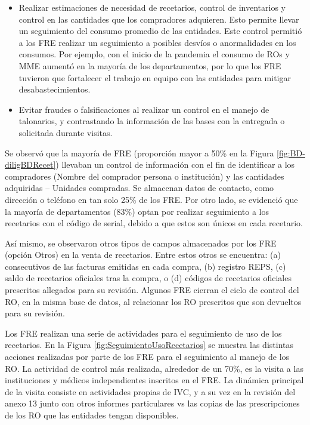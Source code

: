 \documentclass[
  oneside]{book}
\begin{document}
\begin{itemize}
\item
  Realizar estimaciones de necesidad de recetarios, control de inventarios y control en las cantidades que los compradores adquieren. Esto permite llevar un seguimiento del consumo promedio de las entidades. Este control permitió a los FRE realizar un seguimiento a posibles desvíos o anormalidades en los consumos. Por ejemplo, con el inicio de la pandemia el consumo de ROs y MME aumentó en la mayoría de los departamentos, por lo que los FRE tuvieron que fortalecer el trabajo en equipo con las entidades para mitigar desabastecimientos.
\item
  Evitar fraudes o falsificaciones al realizar un control en el manejo de talonarios, y contrastando la información de las bases con la entregada o solicitada durante visitas.
\end{itemize}

Se observó que la mayoría de FRE (proporción mayor a 50\% en la Figura \ref{fig:BD-diligBDRecet}) llevaban un control de información con el fin de identificar a los compradores (Nombre del comprador persona o institución) y las cantidades adquiridas -- Unidades compradas. Se almacenan datos de contacto, como dirección o teléfono en tan solo 25\% de los FRE. Por otro lado, se evidenció que la mayoría de departamentos (83\%) optan por realizar seguimiento a los recetarios con el código de serial, debido a que estos son únicos en cada recetario.

Así mismo, se observaron otros tipos de campos almacenados por los FRE (opción Otros) en la venta de recetarios. Entre estos otros se encuentra: (a) consecutivos de las facturas emitidas en cada compra, (b) registro REPS, (c) saldo de recetarios oficiales tras la compra, o (d) códigos de recetarios oficiales prescritos allegados para su revisión. Algunos FRE cierran el ciclo de control del RO, en la misma base de datos, al relacionar los RO prescritos que son devueltos para su revisión.

Los FRE realizan una serie de actividades para el seguimiento de uso de los recetarios. En la Figura \ref{fig:SeguimientoUsoRecetarios} se muestra las distintas acciones realizadas por parte de los FRE para el seguimiento al manejo de los RO. La actividad de control más realizada, alrededor de un 70\%, es la visita a las instituciones y médicos independientes inscritos en el FRE. La dinámica principal de la visita consiste en actividades propias de IVC, y a su vez en la revisión del anexo 13 junto con otros informes particulares vs las copias de las prescripciones de los RO que las entidades tengan disponibles.
\end{document}
